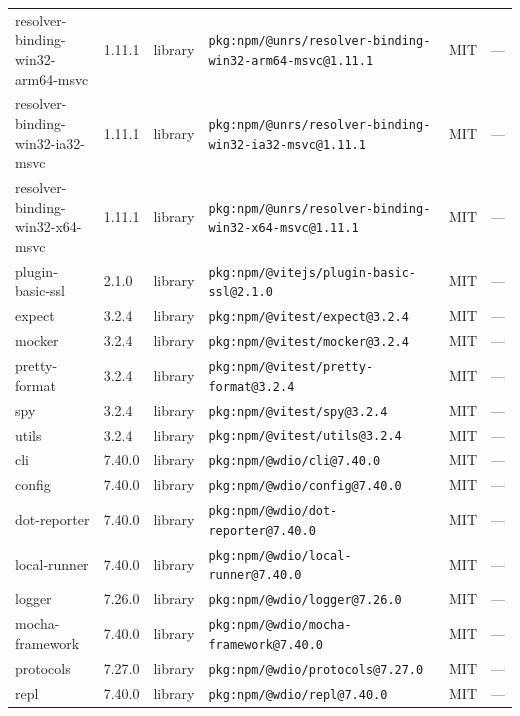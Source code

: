 \documentclass[11pt,a4paper]{article}
\begin{document}
\begin{longtable}{|p{4cm}|p{2cm}|p{1.6cm}|p{5cm}|p{1.5cm}|p{3.5cm}|}
\raggedright resolver-binding-win32-arm64-msvc & 1.11.1 & library & \small\texttt{pkg:npm/@unrs/resolver-binding-win32-arm64-msvc@1.11.1} & MIT & \small — \\
\raggedright resolver-binding-win32-ia32-msvc & 1.11.1 & library & \small\texttt{pkg:npm/@unrs/resolver-binding-win32-ia32-msvc@1.11.1} & MIT & \small — \\
\raggedright resolver-binding-win32-x64-msvc & 1.11.1 & library & \small\texttt{pkg:npm/@unrs/resolver-binding-win32-x64-msvc@1.11.1} & MIT & \small — \\
\raggedright plugin-basic-ssl & 2.1.0 & library & \small\texttt{pkg:npm/@vitejs/plugin-basic-ssl@2.1.0} & MIT & \small — \\
\raggedright expect & 3.2.4 & library & \small\texttt{pkg:npm/@vitest/expect@3.2.4} & MIT & \small — \\
\raggedright mocker & 3.2.4 & library & \small\texttt{pkg:npm/@vitest/mocker@3.2.4} & MIT & \small — \\
\raggedright pretty-format & 3.2.4 & library & \small\texttt{pkg:npm/@vitest/pretty-format@3.2.4} & MIT & \small — \\
\raggedright spy & 3.2.4 & library & \small\texttt{pkg:npm/@vitest/spy@3.2.4} & MIT & \small — \\
\raggedright utils & 3.2.4 & library & \small\texttt{pkg:npm/@vitest/utils@3.2.4} & MIT & \small — \\
\raggedright cli & 7.40.0 & library & \small\texttt{pkg:npm/@wdio/cli@7.40.0} & MIT & \small — \\
\raggedright config & 7.40.0 & library & \small\texttt{pkg:npm/@wdio/config@7.40.0} & MIT & \small — \\
\raggedright dot-reporter & 7.40.0 & library & \small\texttt{pkg:npm/@wdio/dot-reporter@7.40.0} & MIT & \small — \\
\raggedright local-runner & 7.40.0 & library & \small\texttt{pkg:npm/@wdio/local-runner@7.40.0} & MIT & \small — \\
\raggedright logger & 7.26.0 & library & \small\texttt{pkg:npm/@wdio/logger@7.26.0} & MIT & \small — \\
\raggedright mocha-framework & 7.40.0 & library & \small\texttt{pkg:npm/@wdio/mocha-framework@7.40.0} & MIT & \small — \\
\raggedright protocols & 7.27.0 & library & \small\texttt{pkg:npm/@wdio/protocols@7.27.0} & MIT & \small — \\
\raggedright repl & 7.40.0 & library & \small\texttt{pkg:npm/@wdio/repl@7.40.0} & MIT & \small — \\

\end{longtable}
\end{document}
